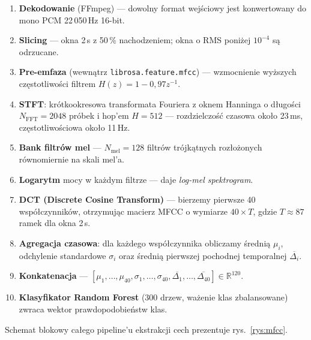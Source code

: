 \documentclass[11pt,a4paper]{article}
\newcommand{\rysref}[1]{rys.~\ref{#1}}
\begin{document}
\begin{enumerate}[label=\textbf{\arabic*.},leftmargin=*]
  \item \textbf{Dekodowanie} (FFmpeg) --- dowolny format wejściowy jest
        konwertowany do mono PCM 22\,050\,Hz 16-bit.
  \item \textbf{Slicing} --- okna 2\,s z 50\,\% nachodzeniem; okna o RMS
        poniżej $10^{-4}$ są odrzucane.
  \item \textbf{Pre-emfaza} (wewnątrz \texttt{librosa.feature.mfcc}) ---
        wzmocnienie wyższych częstotliwości filtrem $H(z) = 1 - 0{,}97z^{-1}$.
  \item \textbf{STFT}: krótkookresowa transformata Fouriera z oknem Hanninga
        o długości $N_{\text{FFT}} = 2048$ próbek i hop'em $H = 512$ ---
        rozdzielczość czasowa około 23\,ms, częstotliwościowa około 11\,Hz.
  \item \textbf{Bank filtrów mel} --- $N_{\text{mel}} = 128$ filtrów
        trójkątnych rozłożonych równomiernie na skali mel'a.
  \item \textbf{Logarytm} mocy w każdym filtrze --- daje \emph{log-mel
        spektrogram}.
  \item \textbf{DCT (Discrete Cosine Transform)} --- bierzemy pierwsze 40
        współczynników, otrzymując macierz MFCC o wymiarze $40 \times T$, gdzie
        $T \approx 87$ ramek dla okna 2\,s.
  \item \textbf{Agregacja czasowa}: dla każdego współczynnika obliczamy
        średnią $\mu_i$, odchylenie standardowe $\sigma_i$ oraz średnią
        pierwszej pochodnej temporalnej $\overline{\Delta_i}$.
  \item \textbf{Konkatenacja} --- $[\mu_1, \dots, \mu_{40},
        \sigma_1, \dots, \sigma_{40}, \overline{\Delta_1}, \dots,
        \overline{\Delta_{40}}] \in \mathbb{R}^{120}$.
  \item \textbf{Klasyfikator Random Forest} (300 drzew, ważenie klas
        zbalansowane) zwraca wektor prawdopodobieństw klas.
\end{enumerate}

Schemat blokowy całego pipeline'u ekstrakcji cech prezentuje
\rysref{rys:mfcc}.
\end{document}
